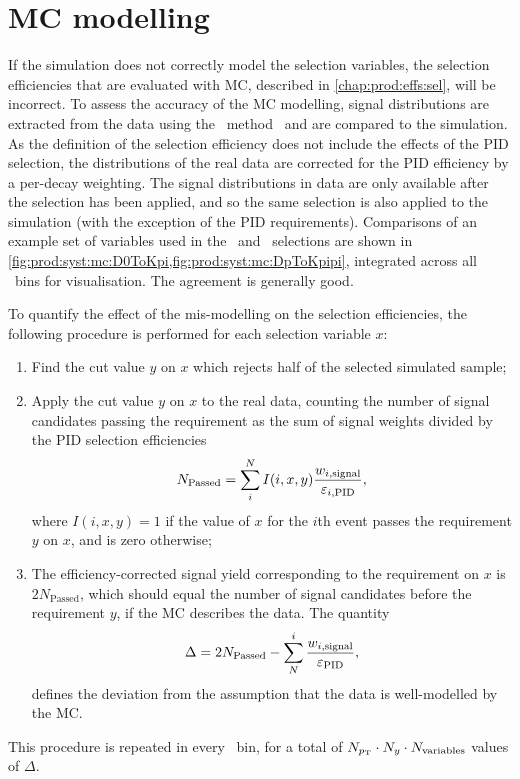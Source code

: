 \section{\acl{MC} modelling}
\label{chap:prod:syst:mc}

If the simulation does not correctly model the selection variables, the
selection efficiencies that are evaluated with \ac{MC}, described in
\cref{chap:prod:effs:sel}, will be incorrect.
To assess the accuracy of the \acl{MC} modelling, signal distributions are
extracted from the data using the \sPlot\ method~\cite{Pivk:2004ty} and are
compared to the simulation.
As the definition of the selection efficiency does not include the effects of
the \ac{PID} selection, the distributions of the real data are corrected for
the \ac{PID} efficiency by a per-decay weighting.
The signal distributions in data are only available after the selection has
been applied, and so the same selection is also applied to the simulation (with
the exception of the \ac{PID} requirements).
Comparisons of an example set of variables used in the \DzToKpi\ and
\DpToKpipi\ selections are shown in
\cref{fig:prod:syst:mc:D0ToKpi,fig:prod:syst:mc:DpToKpipi}, integrated across
all \pTy\ bins for visualisation.
The agreement is generally good.

To quantify the effect of the mis-modelling on the selection efficiencies, the
following procedure is performed for each selection variable $x$:
\begin{enumerate}
  \item Find the cut value $y$ on $x$ which rejects half of the selected
    simulated sample;
  \item Apply the cut value $y$ on $x$ to the real data, counting the number of
    signal candidates passing the requirement as the sum of signal weights
    divided by the \ac{PID} selection efficiencies
    \begin{equation}
      N_{\text{Passed}} = \sum_{i}^{N} I(i, x, y) \frac{%
        w_{i,\text{signal}}
      }{%
        \eff_{i,\text{PID}}
      },
    \end{equation}
    where $I(i, x, y) = 1$ if the value of $x$ for the $i$th event passes the
    requirement $y$ on $x$, and is zero otherwise;
  \item The efficiency-corrected signal yield corresponding to the requirement
    on $x$ is $2N_{\text{Passed}}$, which should equal the number of signal
    candidates before the requirement $y$, if the \ac{MC} describes the data.
    The quantity
    \begin{equation}
      \Delta = 2N_{\text{Passed}} - \sum_{N}^{i} \frac{w_{i,\text{signal}}}{\varepsilon_{\textnormal{PID}}},
      \label{eqn:prod:syst:mc:eff_diff}
    \end{equation}
    defines the deviation from the assumption that the data is well-modelled by
    the \ac{MC}.
\end{enumerate}
This procedure is repeated in every \pTy\ bin, for a total of $N_{p_{\textnormal{T}}} \cdot
N_{y} \cdot N_{\text{variables}}$ values of $\Delta$.

